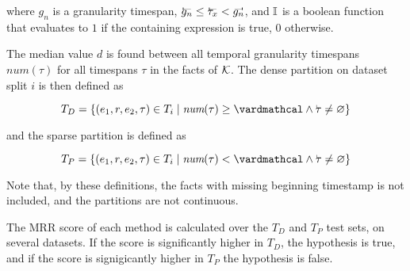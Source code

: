 where $g_n$ is a granularity timespan, $\timebegin{g_n} \leq \timebegin{\tau_x} < \timeend{g_n}$, and $\mathbb{I}$ is a boolean function that evaluates to $1$ if the containing expression is true, $0$ otherwise.

The median value $d$ is found between all temporal granularity timespans $\mathit{num}(\tau)$ for all timespans $\tau$ in the facts of $\mathcal{K}$. The dense partition on dataset split $i$ is then defined as

\begin{equation}
T_D = \{ (e_1, r, e_2, \tau) \in \test_i \mid \textit{num}(\tau) \geq \vard \wedge \timebegin{\tau} \neq \varmiss \}
\end{equation}

\noindent
and the sparse partition is defined as 

\begin{equation}
T_P = \{ (e_1, r, e_2, \tau) \in \test_i \mid \textit{num}(\tau) < \vard \wedge \timebegin{\tau} \neq \varmiss \}
\end{equation}

Note that, by these definitions, the facts with missing beginning timestamp is not included, and the partitions are not continuous.

The MRR score of each method is calculated over the $T_D$ and $T_P$ test sets, on several datasets. If the score is significantly higher in $T_D$, the hypothesis is true, and if the score is signigicantly higher in $T_P$ the hypothesis is false.

\begin{comment}
foreach fact in dataset
    fact_count_i_timespan(fact) >> array
done
sort(array)
median(array)
\end{comment}
